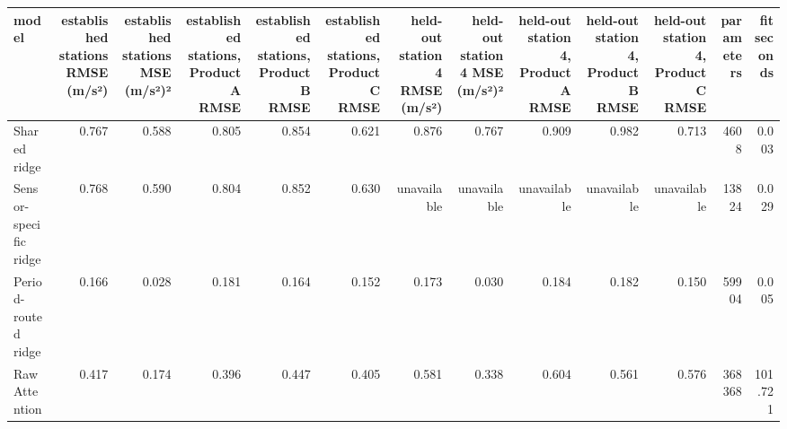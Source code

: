 \begin{tabular}{lrrrrrrrrrrrr}
\toprule
model & established stations RMSE (m/s²) & established stations MSE (m/s²)² & established stations, Product A RMSE & established stations, Product B RMSE & established stations, Product C RMSE & held-out station 4 RMSE (m/s²) & held-out station 4 MSE (m/s²)² & held-out station 4, Product A RMSE & held-out station 4, Product B RMSE & held-out station 4, Product C RMSE & parameters & fit seconds \\
\midrule
Shared ridge & 0.767 & 0.588 & 0.805 & 0.854 & 0.621 & 0.876 & 0.767 & 0.909 & 0.982 & 0.713 & 4608 & 0.003 \\
Sensor-specific ridge & 0.768 & 0.590 & 0.804 & 0.852 & 0.630 & unavailable & unavailable & unavailable & unavailable & unavailable & 13824 & 0.029 \\
Period-routed ridge & 0.166 & 0.028 & 0.181 & 0.164 & 0.152 & 0.173 & 0.030 & 0.184 & 0.182 & 0.150 & 59904 & 0.005 \\
Raw Attention & 0.417 & 0.174 & 0.396 & 0.447 & 0.405 & 0.581 & 0.338 & 0.604 & 0.561 & 0.576 & 368368 & 101.721 \\
\bottomrule
\end{tabular}
